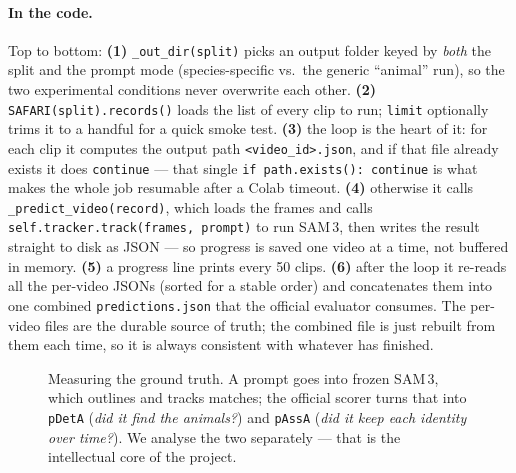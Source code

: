 \documentclass[11pt,a4paper]{article}
\newcommand{\code}[1]{\texttt{#1}}
\begin{document}
\paragraph{In the code.}
Top to bottom: \textbf{(1)} \code{\_out\_dir(split)} picks an output folder keyed by \emph{both} the split
and the prompt mode (species-specific vs.\ the generic ``animal'' run), so the two experimental conditions
never overwrite each other. \textbf{(2)} \code{SAFARI(split).records()} loads the list of every clip to
run; \code{limit} optionally trims it to a handful for a quick smoke test. \textbf{(3)} the loop is the
heart of it: for each clip it computes the output path \code{<video\_id>.json}, and if that file already
exists it does \code{continue} --- that single \code{if path.exists(): continue} is what makes the whole job
resumable after a Colab timeout. \textbf{(4)} otherwise it calls \code{\_predict\_video(record)}, which loads
the frames and calls \code{self.tracker.track(frames, prompt)} to run SAM\,3, then writes the result
straight to disk as JSON --- so progress is saved one video at a time, not buffered in memory. \textbf{(5)}
a progress line prints every 50 clips. \textbf{(6)} after the loop it re-reads all the per-video JSONs
(sorted for a stable order) and concatenates them into one combined \code{predictions.json} that the
official evaluator consumes. The per-video files are the durable source of truth; the combined file is just
rebuilt from them each time, so it is always consistent with whatever has finished.

\begin{figure}[h]
\centering
{}
\caption{Measuring the ground truth. A prompt goes into frozen SAM\,3, which outlines and tracks matches;
the official scorer turns that into \code{pDetA} (\emph{did it find the animals?}) and \code{pAssA}
(\emph{did it keep each identity over time?}). We analyse the two separately --- that is the intellectual
core of the project.}
\label{fig:meas}
\end{figure}
\end{document}
